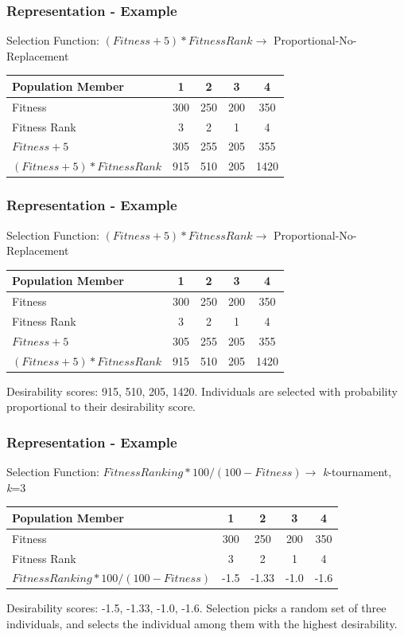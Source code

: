 \documentclass{beamer}
\begin{document}
	\begin{frame}
		\frametitle{Representation - Example}
		Selection Function: $(Fitness + 5) * FitnessRank \rightarrow$ Proportional-No-Replacement
		\begin{table}
			\begin{tabular}{ m{5cm} | c | c | c | c }
				Population Member & 1 & 2 & 3 & 4  \\
				\hline
				Fitness & 300 & 250 & 200 & 350  \\
				Fitness Rank & 3 & 2 & 1 & 4 \\
				\hline
				$Fitness + 5$ & 305 & 255 & 205 & 355 \\ 
				$(Fitness + 5) * FitnessRank$ & 915 & 510 & 205 & 1420 \\
			\end{tabular}
		\end{table}		
	\end{frame} 
	
	\begin{frame}
		\frametitle{Representation - Example}
		Selection Function: $(Fitness + 5) * FitnessRank \rightarrow$ Proportional-No-Replacement
		\begin{table}
			\begin{tabular}{ m{5cm} | c | c | c | c }
				Population Member & 1 & 2 & 3 & 4  \\
				\hline
				Fitness & 300 & 250 & 200 & 350  \\
				Fitness Rank & 3 & 2 & 1 & 4 \\
				\hline
				$Fitness + 5$ & 305 & 255 & 205 & 355 \\ 
				$(Fitness + 5) * FitnessRank$ & 915 & 510 & 205 & 1420 \\
			\end{tabular}
		\end{table}	
		Desirability scores: 915, 510, 205, 1420. Individuals are selected with probability proportional to their desirability score.	
	\end{frame} 			 
	
	\begin{frame}
		\frametitle{Representation - Example}
		Selection Function: $ FitnessRanking*100 / (100-Fitness) \rightarrow$ \textit{k}-tournament, \textit{k}=3
		\begin{table}
			\begin{tabular}{ m{5cm} | c | c | c | c }
				Population Member & 1 & 2 & 3 & 4  \\
				\hline
				Fitness & 300 & 250 & 200 & 350  \\
				Fitness Rank & 3 & 2 & 1 & 4 \\
				$ FitnessRanking*100 / (100-Fitness)$ & -1.5 & -1.33 & -1.0 & -1.6 \\ 
			\end{tabular}
		\end{table}
		Desirability scores: -1.5, -1.33, -1.0, -1.6. Selection picks a random set of three individuals, and selects the individual among them with the highest desirability.
	\end{frame}	
	
\end{document}

